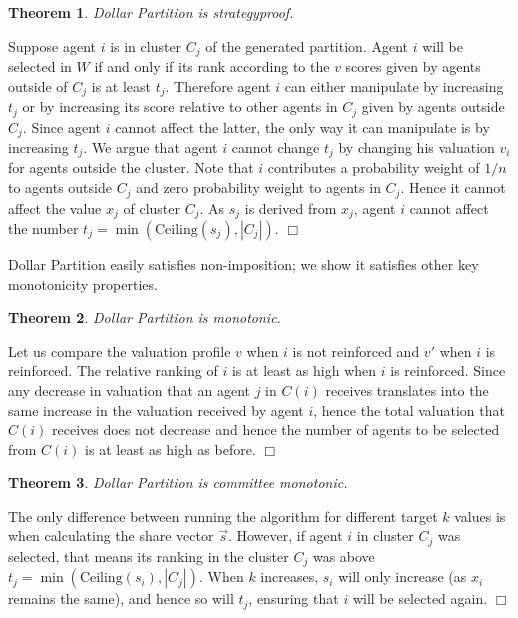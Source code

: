 \documentclass[letterpaper]{article}
\newtheorem{theorem}{Theorem}
\newcommand{\qed}{\unskip\hspace*{1em}\hspace{\fill}$\Box$}
\newenvironment{proof}[1][Proof]{\begin{trivlist}
 \item[\hskip \labelsep {\it #1:}]}{%
 \qed\end{trivlist}}
\begin{document}
\begin{theorem}
	Dollar Partition is strategyproof.
	\end{theorem}
	\begin{proof}
		Suppose agent $i$ is in cluster $C_j$ of the generated partition. Agent $i$ will be selected in $W$ if and only if its rank according to the $v$ scores given by agents outside of $C_j$ is at least $t_j$. Therefore agent $i$ can either manipulate by increasing $t_j$ or by increasing its score relative to other agents in $C_j$ given by agents outside $C_j$. Since agent $i$ cannot affect the latter, the only way it can manipulate is by increasing $t_j$.
		We argue that agent $i$ cannot change $t_j$ by changing his valuation $v_i$ for agents outside the cluster. Note that $i$ contributes a probability weight of $1/n$ to agents outside $C_j$ and zero probability weight to agents in $C_j$. Hence it cannot affect the value $x_j$ of cluster $C_j$. As $s_j$ is derived from $x_j$, agent $i$ cannot affect the number $t_j= \min({\text{Ceiling}(s_j)},|C_j|)$.
	\end{proof}

	Dollar Partition easily satisfies non-imposition; we show it satisfies other
	key monotonicity properties.





		\begin{theorem}
			Dollar Partition is monotonic.
			\end{theorem}
			\begin{proof}

	Let us compare the valuation profile $v$ when $i$ is not reinforced and $v'$ when $i$ is reinforced.
The relative ranking of $i$ is at least as high when $i$ is reinforced. Since any decrease in valuation that an agent $j$ in $C(i)$ receives translates into the same increase in the valuation received by agent $i$, hence the total valuation that $C(i)$ receives does not decrease and hence the number of agents to be selected from $C(i)$ is at least as high as before.
\end{proof}

	\begin{theorem}
		Dollar Partition is committee monotonic.
		\end{theorem}
		\begin{proof}
The only difference between running the algorithm for different target $k$ values is when calculating the share vector $\vec{s}$. However, if agent $i$ in cluster $C_{j}$ was selected, that means its ranking in the cluster $C_{j}$ was above $t_{j}=\min(\text{Ceiling}(s_{i}),|C_{j}|)$. When $k$ increases, $s_{i}$ will only increase (as $x_{i}$ remains the same), and hence so will $t_{j}$, ensuring that $i$ will be selected again.%
			\end{proof}
\end{document}
